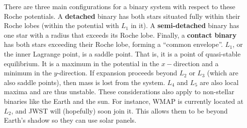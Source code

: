 \documentclass[10pt]{article}
\numberwithin{equation}{section}
\begin{document}
		There are three main configurations for a binary system with respect to these Roche potentials. A \textbf{detached} binary has both stars situated fully within their Roche lobes (within the potential with $L_1$ in it). A \textbf{semi-detached} binary has one star with a radius that exceeds its Roche lobe. Finally, a \textbf{contact binary} has both stars exceeding their Roche lobe, forming a ``common envelope''. $L_1$, or the inner Lagrange point, is a saddle point. That is, it is a point of quasi-stable equilibrium. It is a maximum in the potential in the $x-$direction and a minimum in the $y$-direction. If expansion proceeds beyond $L_2$ or $L_3$ (which are also saddle points), then mass is lost from the system. $L_4$ and $L_5$ are also local maxima and are thus unstable. These considerations also apply to non-stellar binaries like the Earth and the sun. For instance, WMAP is currently located at $L_2$, and JWST will (hopefully) soon join it. This allows them to be beyond Earth's shadow so they can use solar panels.\\
		
\end{document}
